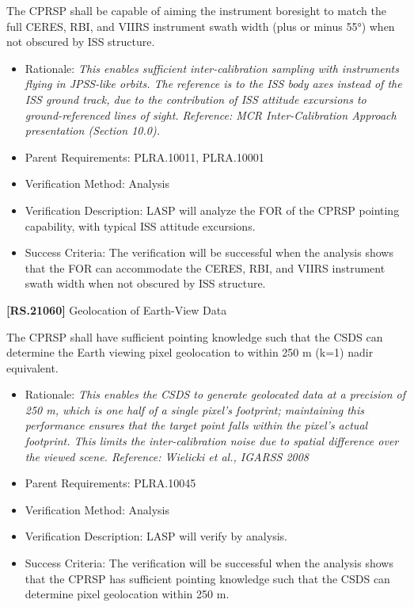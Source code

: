 The \gls{CPRSP} shall be capable of aiming the instrument boresight to match the full \gls{CERES}, \gls{RBI}, and \gls{VIIRS} instrument swath width (plus or minus 55°) when not obscured by \gls{ISS} structure.

\begin{itemize}
\item{} Rationale: \emph{This enables sufficient inter-calibration sampling with instruments flying in JPSS-like orbits. The reference is to the ISS body axes instead of the ISS ground track, due to the contribution of ISS attitude excursions to ground-referenced lines of sight. Reference: MCR Inter-Calibration Approach presentation (Section 10.0).}

\item{} Parent Requirements: PLRA.10011, PLRA.10001

\item{} Verification Method: Analysis

\item{} Verification Description: \gls{LASP} will analyze the FOR of the \gls{CPRSP} \gls{point}ing capability, with typical \gls{ISS} attitude excursions.

\item{} Success Criteria: The verification will be successful when the \gls{analysis} shows that the FOR can accommodate the \gls{CERES}, \gls{RBI}, and \gls{VIIRS} instrument swath width when not obscured by \gls{ISS} structure.

\end{itemize}

\textbf{[RS.21060]} Geolocation of Earth-View Data

The \gls{CPRSP} shall have sufficient \gls{point}ing knowledge such that the \gls{CSDS} can determine the Earth viewing pixel geolocation to within 250 m (k=1) nadir equivalent.

\begin{itemize}
\item{} Rationale: \emph{This enables the CSDS to generate geolocated data at a precision of 250 m, which is one half of a single pixel's footprint; maintaining this performance ensures that the target point falls within the pixel's actual footprint. This limits the inter-calibration noise due to spatial difference over the viewed scene. Reference: Wielicki et al., IGARSS 2008}

\item{} Parent Requirements: PLRA.10045

\item{} Verification Method: Analysis

\item{} Verification Description: \gls{LASP} will verify by \gls{analysis}.

\item{} Success Criteria: The verification will be successful when the \gls{analysis} shows that the \gls{CPRSP} has sufficient \gls{point}ing knowledge such that the \gls{CSDS} can determine pixel geolocation within 250 m.

\end{itemize}

